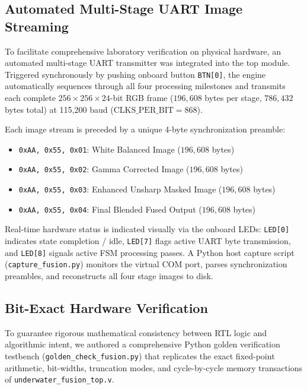 \documentclass[10pt,twocolumn,letterpaper]{article}
\begin{document}
{\subsection{Automated Multi-Stage UART Image Streaming}
\label{subsec:uart_streaming}

To facilitate comprehensive laboratory verification on physical hardware, an automated multi-stage UART transmitter was integrated into the top module. Triggered synchronously by pushing onboard button \texttt{BTN[0]}, the engine automatically sequences through all four processing milestones and transmits each complete $256\times256\times24$-bit RGB frame ($196,608$ bytes per stage, $786,432$ bytes total) at 115,200 baud ($\text{CLKS\_PER\_BIT} = 868$).

Each image stream is preceded by a unique 4-byte synchronization preamble:
\begin{itemize}
    \item \texttt{0xAA, 0x55, 0x01}: White Balanced Image ($196,608$ bytes)
    \item \texttt{0xAA, 0x55, 0x02}: Gamma Corrected Image ($196,608$ bytes)
    \item \texttt{0xAA, 0x55, 0x03}: Enhanced Unsharp Masked Image ($196,608$ bytes)
    \item \texttt{0xAA, 0x55, 0x04}: Final Blended Fused Output ($196,608$ bytes)
\end{itemize}
Real-time hardware status is indicated visually via the onboard LEDs: \texttt{LED[0]} indicates state completion / idle, \texttt{LED[7]} flags active UART byte transmission, and \texttt{LED[8]} signals active FSM processing passes. A Python host capture script (\texttt{capture\_fusion.py}) monitors the virtual COM port, parses synchronization preambles, and reconstructs all four stage images to disk.

\subsection{Bit-Exact Hardware Verification}
\label{subsec:bit_exact_verification}

To guarantee rigorous mathematical consistency between RTL logic and algorithmic intent, we authored a comprehensive Python golden verification testbench (\texttt{golden\_check\_fusion.py}) that replicates the exact fixed-point arithmetic, bit-widths, truncation modes, and cycle-by-cycle memory transactions of \texttt{underwater\_fusion\_top.v}.

}
\end{document}
